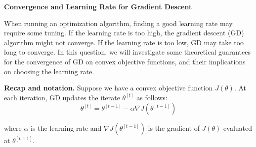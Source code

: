 \item {}	{\bf Convergence and Learning Rate for Gradient Descent}

When running an optimization algorithm, finding a good learning rate may require some tuning. 
If the learning rate is too high, the gradient descent (GD) algorithm might not converge. If the learning rate is too low, GD may take too long to converge.
In this question, we will investigate some theoretical guarantees for the convergence of GD on convex objective functions, and their implications on choosing the learning rate.

{\bf Recap and notation.} Suppose we have a convex
objective function $J(\theta)$. At each iteration, GD updates the iterate $\theta^{[t]}$ as 
follows:
\begin{equation*}
	\theta^{[t]} = \theta^{[t-1]} - \alpha\nabla J(\theta^{[t-1]})
\end{equation*}

where $\alpha$ is the learning rate and $\nabla J(\theta^{[t-1]})$ is the gradient of $J(\theta)$ evaluated at $\theta^{[t-1]}$.

\begin{enumerate}


\ifnum{}\fi



\ifnum{}\fi



\ifnum{}\fi



\ifnum{}\fi



\ifnum{}\fi



\end{enumerate}